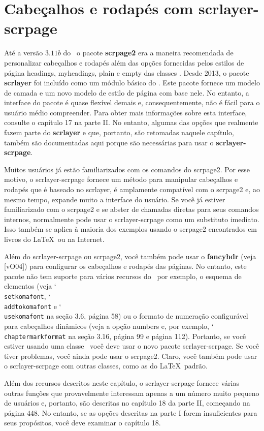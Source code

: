 \chapter{Cabeçalhos e rodapés com scrlayer-scrpage}

Até a versão $3.11b$ do \KOMAScript\ o pacote \textbf{scrpage2} era a maneira recomendada de personalizar cabeçalhos e rodapés além das opções fornecidas pelos estilos de página headings, myheadings, plain e empty das classes \KOMAScript. Desde 2013, o pacote \textbf{scrlayer} foi incluído como um módulo básico do \KOMAScript. Este pacote fornece um modelo de camada e um novo modelo de estilo de página com base nele. No entanto, a interface do pacote é quase flexível demais e, consequentemente, não é fácil para o usuário médio compreender. Para obter mais informações sobre esta interface, consulte o capítulo 17 na parte II. No entanto, algumas das opções que realmente fazem parte do \textbf{scrlayer} e que, portanto, são retomadas naquele capítulo, também são documentadas aqui porque são necessárias para usar o \textbf{scrlayer-scrpage}.

Muitos usuários já estão familiarizados com os comandos do scrpage2. Por esse motivo, o scrlayer-scrpage fornece um método para manipular cabeçalhos e rodapés que é baseado no scrlayer, é amplamente compatível com o scrpage2 e, ao mesmo tempo, expande muito a interface do usuário. Se você já estiver familiarizado com o scrpage2 e se abster de chamadas diretas para seus comandos internos, normalmente pode usar o scrlayer-scrpage como um substituto imediato. Isso também se aplica à maioria dos exemplos usando o scrpage2 encontrados em livros do \LaTeX\ ou na Internet.

Além do scrlayer-scrpage ou scrpage2, você também pode usar o \textbf{fancyhdr} (veja [vO04]) para configurar os cabeçalhos e rodapés das páginas. No entanto, este pacote não tem suporte para vários recursos do \KOMAScript\ por exemplo, o esquema de elementos (veja \char`\\\texttt{set\-ko\-ma\-font}, \char`\\\texttt{add\-to\-ko\-ma\-font} e \char`\\\texttt{use\-ko\-ma\-font} na seção 3.6, página 58) ou o formato de numeração configurável para cabeçalhos dinâmicos (veja a opção numbers e, por exemplo, \char`\\\texttt{chap\-ter\-mark\-for\-mat} na seção 3.16, página 99 e página 112). Portanto, se você estiver usando uma classe \KOMAScript\ você deve usar o novo pacote scrlayer-scrpage. Se você tiver problemas, você ainda pode usar o scrpage2. Claro, você também pode usar o scrlayer-scrpage com outras classes, como as do \LaTeX\ padrão.

Além dos recursos descritos neste capítulo, o scrlayer-scrpage fornece várias outras funções que provavelmente interessam apenas a um número muito pequeno de usuários e, portanto, são descritas no capítulo 18 da parte II, começando na página 448. No entanto, se as opções descritas na parte I forem insuficientes para seus propósitos, você deve examinar o capítulo 18.


